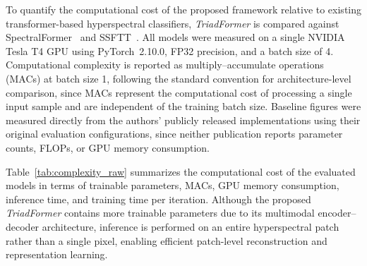 \documentclass[pdflatex,sn-mathphys-num]{sn-jnl}
\begin{document}
To quantify the computational cost of the proposed framework relative to existing transformer-based hyperspectral classifiers, \textit{TriadFormer} is compared against SpectralFormer~\cite{ref12} and SSFTT~\cite{ref11}. All models were measured on a single NVIDIA Tesla T4 GPU using PyTorch~2.10.0, FP32 precision, and a batch size of 4. Computational complexity is reported as multiply--accumulate operations (MACs) at batch size 1, following the standard convention for architecture-level comparison, since MACs represent the computational cost of processing a single input sample and are independent of the training batch size. Baseline figures were measured directly from the authors' publicly released implementations using their original evaluation configurations, since neither publication reports parameter counts, FLOPs, or GPU memory consumption.

\begin{table}[!t]
\centering
\caption{Computational cost per forward pass measured on a single NVIDIA Tesla T4 GPU using PyTorch~2.10.0, FP32 precision, and a batch size of 4. Computational complexity is reported as multiply--accumulate operations (MACs) at batch size 1.}
\label{tab:complexity_raw}
\renewcommand{\arraystretch}{1.15}

\end{table}

Table~\ref{tab:complexity_raw} summarizes the computational cost of the evaluated models in terms of trainable parameters, MACs, GPU memory consumption, inference time, and training time per iteration. Although the proposed \textit{TriadFormer} contains more trainable parameters due to its multimodal encoder--decoder architecture, inference is performed on an entire hyperspectral patch rather than a single pixel, enabling efficient patch-level reconstruction and representation learning.
\end{document}
